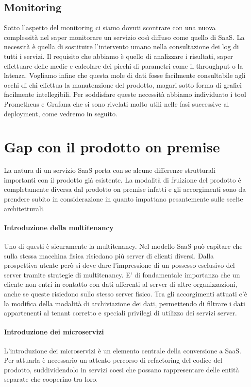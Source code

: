 \subsection{Monitoring}
Sotto l'aspetto del monitoring ci siamo dovuti scontrare con una nuova complessità nel saper monitorare un servizio così diffuso come quello di SaaS. La necessità è quella di sostituire l'intervento umano nella consultazione dei log di tutti i servizi. Il requisito che abbiamo è quello di analizzare i risultati, saper effettuare delle medie e calcolare dei picchi di parametri come il throughput o la latenza. Vogliamo infine che questa mole di dati fosse facilmente consultabile agli occhi di chi effettua la manutenzione del prodotto, magari sotto forma di grafici facilmente intellegibili. Per soddisfare queste necessità abbiamo individuato i tool Prometheus e Grafana che si sono rivelati molto utili nelle fasi successive al deployment, come vedremo in seguito.  


\section{Gap con il prodotto on premise}
La natura di un servizio SaaS porta con se alcune differenze strutturali importanti con il prodotto già esistente. La modalità di fruizione del prodotto è completamente diversa dal prodotto on premise infatti e gli accorgimenti sono da prendere subito in considerazione in quanto impattano pesantemente sulle scelte architetturali.
\paragraph{Introduzione della multitenancy}
Uno di questi è sicuramente la multitenancy. Nel modello SaaS può capitare che sulla stessa macchina fisica risiedano più server di clienti diversi. Dalla prospettiva utente però si deve dare l'impressione di un possesso esclusivo del server tramite strategie di multitenancy. E' di fondamentale importanza che un cliente non entri in contatto con dati afferenti al server di altre organizzazioni, anche se queste risiedono sullo stesso server fisico. Tra gli accorgimenti attuati c'è la modifica della modalità di archiviazione dei dati, permettendo di filtrare i dati appartenenti al tenant corretto e speciali privilegi di utilizzo dei servizi server. 
\paragraph{Introduzione dei microservizi}
L'introduzione dei microservizi è un elemento centrale della conversione a SaaS. Per attuarla è necessario un attento percorso di refactoring del codice del prodotto, suddividendolo in servizi coesi che possano rappresentare delle entità separate che cooperino tra loro.

